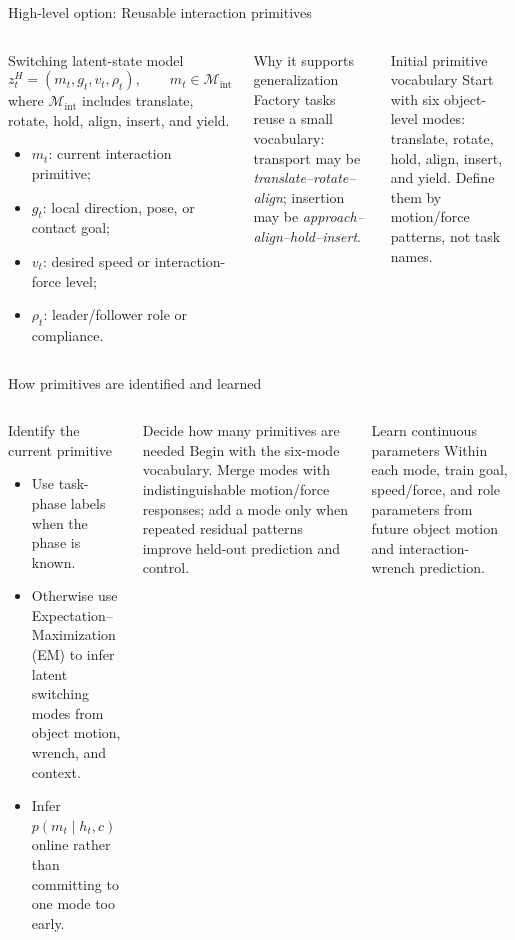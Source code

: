 \documentclass[aspectratio=169,11pt]{beamer}
\begin{document}
\begin{frame}{High-level option: Reusable interaction primitives}
\begin{columns}[T,onlytextwidth]
\begin{block}{Switching latent-state model}
\[
z_t^H=(m_t,g_t,v_t,\rho_t),\qquad m_t\in\mathcal M_{\mathrm{int}}
\]
where $\mathcal M_{\mathrm{int}}$ includes translate, rotate, hold, align, insert, and yield.
\begin{itemize}
  \item $m_t$: current interaction primitive;
  \item $g_t$: local direction, pose, or contact goal;
  \item $v_t$: desired speed or interaction-force level;
  \item $\rho_t$: leader/follower role or compliance.
\end{itemize}
\end{block}
\begin{exampleblock}{Why it supports generalization}
Factory tasks reuse a small vocabulary: transport may be \emph{translate--rotate--align}; insertion may be \emph{approach--align--hold--insert}.
\end{exampleblock}
\begin{alertblock}{Initial primitive vocabulary}
Start with six object-level modes: translate, rotate, hold, align, insert, and yield. Define them by motion/force patterns, not task names.
\end{alertblock}
\end{columns}
\end{frame}

\begin{frame}{How primitives are identified and learned}
\begin{columns}[T,onlytextwidth]
\begin{block}{Identify the current primitive}
\begin{itemize}
  \item Use task-phase labels when the phase is known.
  \item Otherwise use Expectation--Maximization (EM) to infer latent switching modes from object motion, wrench, and context.
  \item Infer $p(m_t\mid h_t,c)$ online rather than committing to one mode too early.
\end{itemize}
\end{block}
\begin{block}{Decide how many primitives are needed}
Begin with the six-mode vocabulary. Merge modes with indistinguishable motion/force responses; add a mode only when repeated residual patterns improve held-out prediction and control.
\end{block}
\begin{alertblock}{Learn continuous parameters}
Within each mode, train goal, speed/force, and role parameters from future object motion and interaction-wrench prediction.
\end{alertblock}
\end{columns}
\end{frame}
\end{document}
